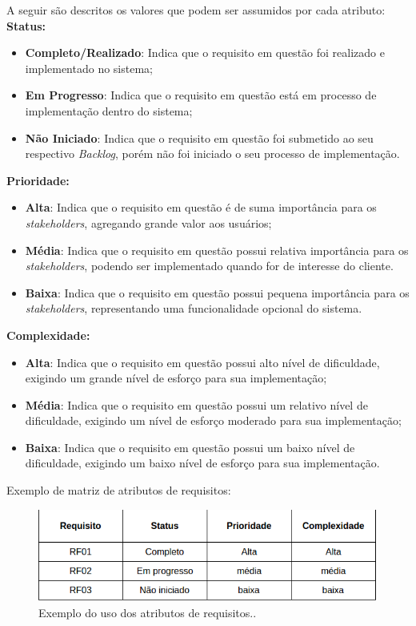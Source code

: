     A seguir são descritos os valores que podem ser assumidos por cada atributo:
    \textbf{Status:}
    \begin{itemize}
     \item \textbf{Completo/Realizado}: Indica que o requisito em questão foi realizado e implementado no sistema; 
     \item \textbf{Em Progresso}: Indica que o requisito em questão está em processo de implementação dentro do sistema;
     \item \textbf{Não Iniciado}: Indica que o requisito em questão foi submetido ao seu respectivo \textit{Backlog}, porém não foi iniciado o seu processo de implementação.
    \end{itemize}
    \textbf{Prioridade:}
    \begin{itemize}
     \item \textbf{Alta}: Indica que o requisito em questão é de suma importância para os \textit{stakeholders}, agregando grande valor aos usuários;
     \item \textbf{Média}: Indica que o requisito em questão possui relativa importância para os \textit{stakeholders}, podendo ser implementado quando for de interesse do cliente.
     \item \textbf{Baixa}: Indica que o requisito em questão possui pequena importância para os \textit{stakeholders}, representando uma funcionalidade opcional do sistema.
    \end{itemize}
    \textbf{Complexidade:}
    \begin{itemize}
     \item \textbf{Alta}: Indica que o requisito em questão possui alto nível de dificuldade, exigindo um grande nível de esforço para sua implementação;
     \item \textbf{Média}: Indica que o requisito em questão possui um relativo nível de dificuldade, exigindo um nível de esforço moderado para sua implementação;
     \item \textbf{Baixa}: Indica que o requisito em questão possui um baixo nível de dificuldade, exigindo um baixo nível de esforço para sua implementação.
    \end{itemize}
  
    Exemplo de matriz de atributos de requisitos:
    \begin{figure}[!htbp]
      \centering
      \includegraphics[scale=0.5]{editaveis/figuras/example_atributes}
      \caption[Exemplo do uso dos atributos de requisitos.] {Exemplo do uso dos atributos de requisitos.. \footnotemark}
      \label{example_atributes}
    \end{figure}
  
